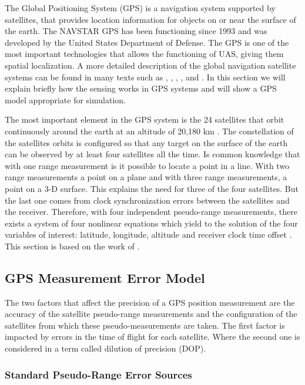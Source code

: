 The Global Positioning System (GPS) is a navigation system supported by satellites, that provides location information for objects on or near the surface of the earth. The NAVSTAR GPS has been functioning since 1993 and was developed by the United States Department of Defense. The GPS is one of the most important technologies that allows the functioning of UAS, giving them spatial localization. A more detailed description of the global navigation satellite systems can be found in many texts such as \cite{Zogg2009}, \cite{Parkinson1996}, \cite{Parkinson1996a}, \cite{Kaplan2005}, and \cite{Grewal2007}. In this section we will explain briefly how the sensing works in GPS systems and will show a GPS model appropriate for simulation.

The most important element in the GPS system is the 24 satellites that orbit continuously around the earth at an altitude of 20,180 km \cite{Zogg2009}. The constellation of the satellites orbits is configured so that any target on the surface of the earth can be observed by at least four satellites all the time. Is common knowledge that with one range measurement is it possible to locate a point in a line. With two range measurements a point on a plane and with three range measurements, a point on a 3-D surface. This explains the need for three of the four satellites. But the last one comes from clock synchronization errors between the satellites and the receiver. Therefore, with four independent pseudo-range measurements, there exists a system of four nonlinear equations which yield to the solution of the four variables of interest: latitude, longitude, altitude and receiver clock time offset \cite{Zogg2009}. This section is based on the work of \cite{Beard2010}.

\subsection{GPS Measurement Error Model}{\label{sub:gps_meas_error}}
The two factors that affect the precision of a GPS position measurement are the accuracy of the satellite pseudo-range measurements and the configuration of the satellites from which these pseudo-measurements are taken. The first factor is impacted by errors in the time of flight for each satellite. Where the second one is considered in a term called dilution of precision (DOP).
\pagebreak
\subsubsection{Standard Pseudo-Range Error Sources}
